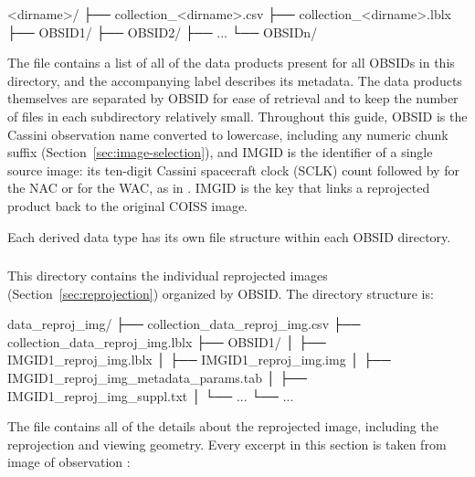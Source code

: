 \begin{CodeBlock}
<dirname>/
├── collection_<dirname>.csv
├── collection_<dirname>.lblx
├── OBSID1/
├── OBSID2/
├── ...
└── OBSIDn/
\end{CodeBlock}

The  file contains a list of all of the data products present for all OBSIDs in this directory, and the accompanying label describes its metadata. The data products themselves are separated by OBSID for ease of retrieval and to keep the number of files in each subdirectory relatively small. Throughout this guide, OBSID is the Cassini observation name converted to lowercase, including any numeric chunk suffix (Section~\ref{sec:image-selection}), and IMGID is the identifier of a single source image: its ten-digit Cassini spacecraft clock (SCLK) count followed by  for the NAC or  for the WAC, as in . IMGID is the key that links a reprojected product back to the original COISS image.

Each derived data type has its own file structure within each OBSID directory.


\subsubsection{}
\label{sec:data-reproj-img}

This directory contains the individual reprojected images (Section~\ref{sec:reprojection}) organized by OBSID. The directory structure is:

\begin{CodeBlock}
data_reproj_img/
├── collection_data_reproj_img.csv
├── collection_data_reproj_img.lblx
├── OBSID1/
│   ├── IMGID1_reproj_img.lblx
│   ├── IMGID1_reproj_img.img
│   ├── IMGID1_reproj_img_metadata_params.tab
│   ├── IMGID1_reproj_img_suppl.txt
│   └── ...
└── ...
\end{CodeBlock}

The file  contains all of the details about the reprojected image, including the reprojection and viewing geometry. Every excerpt in this section is taken from image  of observation :


